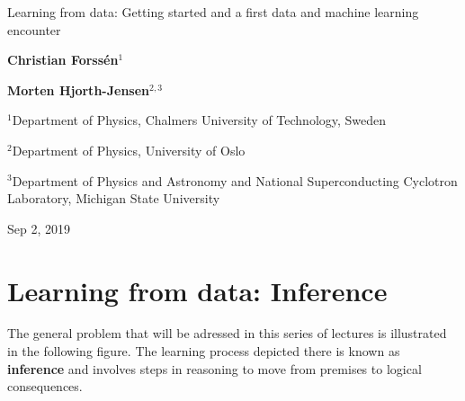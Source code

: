 \documentclass[%
oneside,                 %
final,                   %
10pt]{article}
\begin{document}

\newcommand{\exercisesection}[1]{\subsection*{#1}}







\thispagestyle{empty}

\begin{center}
{\LARGE\bf
\begin{spacing}{1.25}
Learning from data: Getting started and a first data and machine learning encounter
\end{spacing}
}
\end{center}


\begin{center}
{\bf Christian Forssén${}^{1}$} \\ [0mm]
\end{center}


\begin{center}
{\bf Morten Hjorth-Jensen${}^{2, 3}$} \\ [0mm]
\end{center}

\begin{center}
\centerline{{\small ${}^1$Department of Physics, Chalmers University of Technology, Sweden}}
\centerline{{\small ${}^2$Department of Physics, University of Oslo}}
\centerline{{\small ${}^3$Department of Physics and Astronomy and National Superconducting Cyclotron Laboratory, Michigan State University}}
\end{center}
    

\begin{center}
Sep 2, 2019
\end{center}

\vspace{1cm}


\section{Learning from data: Inference}
The general problem that will be adressed in this series of lectures is illustrated in the following figure. The learning process depicted there is known as \textbf{inference} and involves steps in reasoning to move from premises to logical consequences. 
\end{document}
